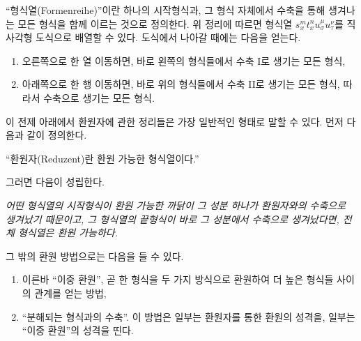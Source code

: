 
``형식열(Formenreihe)''이란 하나의 시작형식과, 그 형식 자체에서 수축을 통해 생겨나는 모든 형식을 함께 이르는 것으로 정의한다. 위 정리에 따르면 형식열 $s_x^m t_x^n u_\sigma^\mu u_\tau^\nu$를 직사각형 도식으로 배열할 수 있다. 도식에서 나아갈 때에는 다음을 얻는다.
\begin{enumerate}
\item 오른쪽으로 한 열 이동하면, 바로 왼쪽의 형식들에서 수축 I로 생기는 모든 형식,
\item 아래쪽으로 한 행 이동하면, 바로 위의 형식들에서 수축 II로 생기는 모든 형식, 따라서 수축으로 생기는 모든 형식.
\end{enumerate}

이 전제 아래에서 환원자에 관한 정리들은 가장 일반적인 형태로 말할 수 있다. 먼저 다음과 같이 정의한다.
\begin{center}
``환원자(Reduzent)란 환원 가능한 형식열이다.''
\end{center}
그러면 다음이 성립한다.

\begin{center}
\emph{어떤 형식열의 시작형식이 환원 가능한 까닭이 그 성분 하나가 환원자와의 수축으로 생겨났기 때문이고, 그 형식열의 끝형식이 바로 그 성분에서 수축으로 생겨났다면, 전체 형식열은 환원 가능하다.}
\end{center}

그 밖의 환원 방법으로는 다음을 들 수 있다.
\begin{enumerate}
\item 이른바 ``이중 환원'', 곧 한 형식을 두 가지 방식으로 환원하여 더 높은 형식들 사이의 관계를 얻는 방법,
\item ``분해되는 형식과의 수축''. 이 방법은 일부는 환원자를 통한 환원의 성격을, 일부는 ``이중 환원''의 성격을 띤다.
\end{enumerate}
